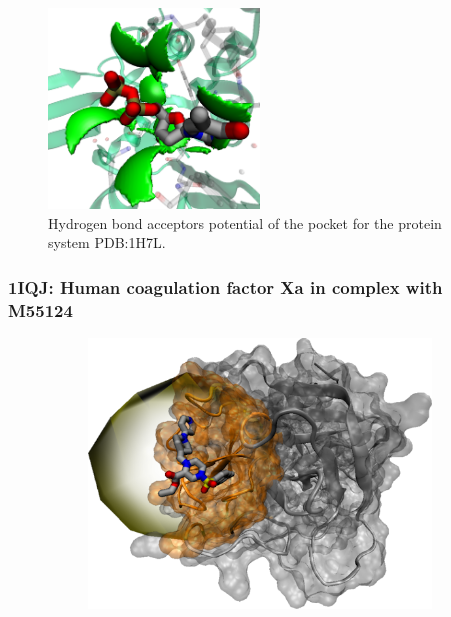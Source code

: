       \begin{figure}[H]
        \centering
        \includegraphics[width=0.5\textwidth]{figures/results/benchmark_prot/1h7l.png}
        \caption{\label{fig:benchmark/1h7l} Hydrogen bond acceptors potential of the pocket for the protein system PDB:1H7L.}
      \end{figure}
    \pagebreak

    \subsubsection{1IQJ: Human coagulation factor Xa in complex with M55124}
      \begin{figure}[H] \centering
        \begin{subfigure}[c]{0.3\textwidth} \centering
          \includegraphics[width=1\textwidth]{figures/results/ps_prot/1iqj.png}
        \end{subfigure}
        \begin{subfigure}[c]{0.3\textwidth} \centering
        \end{subfigure}
      \end{figure}

